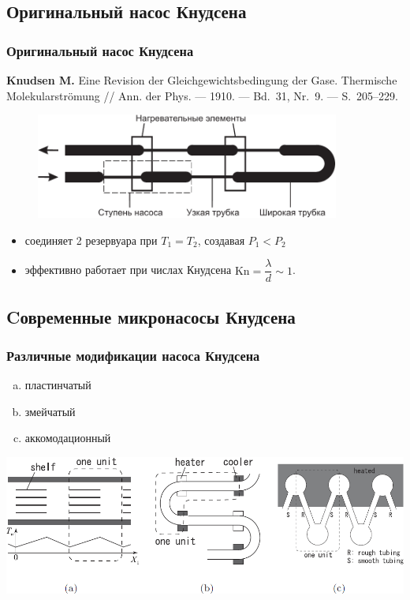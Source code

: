 \documentclass[ucs]{beamer}
\newcommand{\Kn}{\mathrm{Kn}}
\begin{document}
\subsection{Оригинальный насос Кнудсена}
\begin{frame}
	\frametitle{Оригинальный насос Кнудсена}
	\begin{block}{}
		\textbf{Knudsen M.} Eine Revision der Gleichgewichtsbedingung der Gase. Thermische Molekularströmung 
		// Ann. der Phys. — 1910. — Bd.~31, Nr.~9. — S.~205–229.
	\end{block}
	\begin{figure}
		\includegraphics[width=10cm]{knudsen_device.pdf}
	\end{figure}
	\begin{itemize}
		\item соединяет 2 резервуара при \(T_1=T_2\), создавая \(P_1<P_2\)
		\item эффективно работает при числах Кнудсена \( \Kn=\dfrac{\lambda}{d} \sim 1\).
	\end{itemize}
\end{frame}

\subsection{Cовременные микронасосы Кнудсена}
\begin{frame}
	\frametitle{Различные модификации насоса Кнудсена}
	\begin{enumerate}[(a)]
		\item пластинчатый
		\item змейчатый
		\item аккомодационный
	\end{enumerate}
	\bigskip
	\includegraphics[width=\columnwidth]{pumps.png}
\end{frame}
\end{document}
